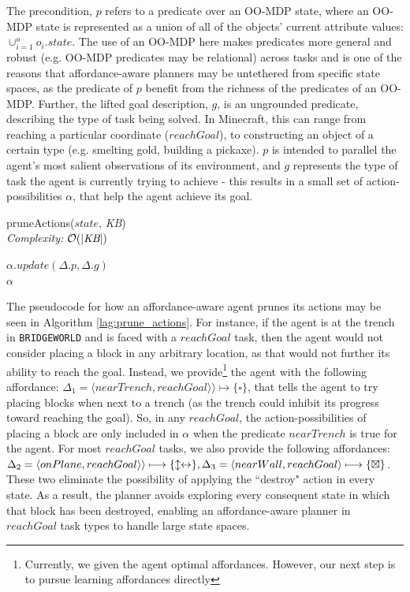\documentclass[]{article}
\begin{document}
The precondition, $p$ refers to a predicate over an OO-MDP state, where an OO-MDP state is represented
as a union of all of the objects' current attribute values:
$\cup_{i = 1}^o o_i.state$.  The use of an OO-MDP here makes
predicates more general and robust (e.g. OO-MDP predicates may be relational) 
across tasks and is one of the reasons that affordance-aware 
planners may be untethered from specific state spaces, as the predicate of
$p$  benefit from the richness of the predicates of an OO-MDP. Further, the 
lifted goal description, $g$, is an ungrounded predicate, describing the type of task being solved. In Minecraft,
this can range from reaching a particular coordinate ($reachGoal$), to constructing
an object of a certain type (e.g. smelting gold, building a pickaxe). $p$ is intended
to parallel the agent's most salient observations of its environment, and $g$ represents
the type of task the agent is currently trying to achieve - this results in a small set of 
action-possibilities $\alpha$, that help the agent achieve its goal.

\begin{algorithm}
  \caption{pruneActions($state$, {\it KB}) \\ {\it Complexity:} $\mathcal{O}(|\text{{\it KB}}|)$}
  \begin{algorithmic}[1]
    \State $\alpha.update(\Delta.p, \Delta.g)$
    \EndIf
    \EndFor \\
    \Return $\alpha$
  \end{algorithmic}
  \label{alg:prune_actions}
\end{algorithm}


The pseudocode for how an affordance-aware agent prunes its actions may be seen in Algorithm \ref{lag:prune_actions}. For instance, if the agent is at the trench in \texttt{BRIDGEWORLD} and is faced with a $reachGoal$ task, then the agent would not consider placing a block
in any arbitrary location, as that would not further its ability to reach the goal. Instead, we provide\footnote{Currently, we given the agent optimal affordances. However, our next step is to pursue learning affordances directly}
the agent with the following affordance: $\Delta_1 = \langle nearTrench, reachGoal \rangle \rangle \longmapsto \{\square\}$,
that tells the agent to try placing blocks when next to a trench
(as the trench could inhibit its progress toward reaching the goal). So, in any $reachGoal$, the action-possibilities of placing a block are only included in $\alpha$ when the predicate $nearTrench$ is true for the agent. For most $reachGoal$ tasks, we also provide the following affordances: $\Delta_2 = \langle onPlane, reachGoal \rangle \rangle \longmapsto \{\updownarrow \leftrightarrow\}, \\ \Delta_3 = \langle nearWall, reachGoal \rangle \longmapsto \{\boxtimes \}$.
These two eliminate the possibility of applying the ``destroy" action in every state.
As a result, the planner avoids exploring every consequent state in which that block has
been destroyed, enabling an affordance-aware planner in $reachGoal$ task
types to handle large state spaces.
\end{document}
